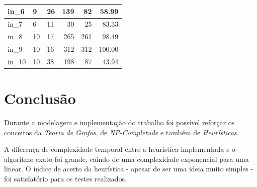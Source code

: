 \documentclass[10pt,a4paper]{article}
\begin{document}
\begin{table}[h!]
\begin{tabular}{|l|l|l|r|r|r|}
in\_6                  & 9          & 26         & 139                                                                                                              & 82                                                                                                                    & 58.99                                                    \\ \hline
in\_7                  & 6          & 11         & 30                                                                                                               & 25                                                                                                                    & 83.33                                                    \\ \hline
in\_8                  & 10         & 17         & 265                                                                                                              & 261                                                                                                                   & 98.49                                                    \\ \hline
in\_9                  & 10         & 16         & 312                                                                                                              & 312                                                                                                                   & 100.00                                                   \\ \hline
in\_10                 & 10         & 38         & 198                                                                                                              & 87                                                                                                                    & 43.94                                                    \\ \hline
\end{tabular}
\end{table}

	\section{Conclusão}

	Durante a modelagem e implementação do trabalho foi possível reforçar os conceitos da \emph{Teoria de Grafos}, de \emph{NP-Completude} 
	e também de \emph{Heurísticas}.

	A diferença de complexidade temporal entre a heurística implementada e o algoritmo exato foi grande, caindo de uma complexidade exponencial para uma linear.
	O índice de acerto da heurística - apesar de ser uma ideia muito simples - foi satisfatório para os testes realizados. 
\end{document}
